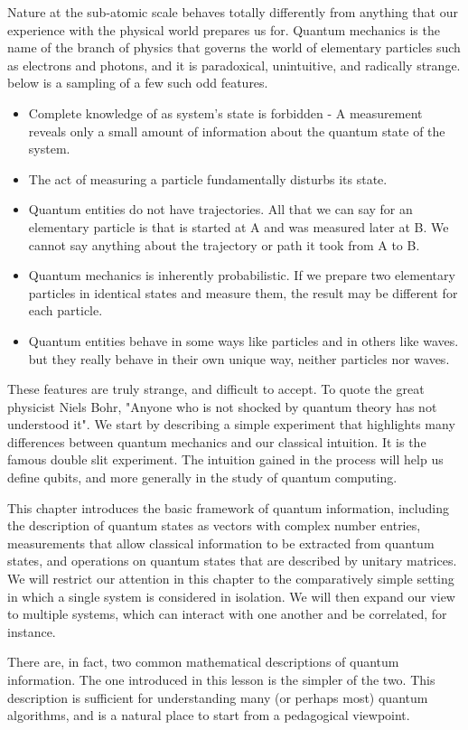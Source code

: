 Nature at the sub-atomic scale behaves totally differently from anything that our experience with the physical world prepares us for. Quantum mechanics is the name of the branch of physics that governs the world of elementary particles such as electrons and photons, and it is paradoxical, unintuitive, and radically strange. below is a sampling of a few such odd features.
\begin{itemize}
    \item Complete knowledge of as system's state is forbidden - A measurement reveals only a small amount of information about the quantum state of the system.
    \item The act of measuring a particle fundamentally disturbs its state.
    \item Quantum entities do not have trajectories. All that we can say for an elementary particle is that is started at A and was measured later at B. We cannot say anything about the trajectory or path it took from A to B.
    \item Quantum mechanics is inherently probabilistic. If we prepare two elementary particles in identical states and measure them, the result may be different for each particle.
    \item Quantum entities behave in some ways like particles and in others like waves. but they really behave in their own unique way, neither particles nor waves.
\end{itemize}
These features are truly strange, and difficult to accept. To quote the great physicist Niels Bohr, "Anyone who is not shocked by quantum theory has not understood it". We start by describing a simple experiment that highlights many differences between quantum mechanics and our classical intuition. It is the famous double slit experiment. The intuition gained in the process will help us define qubits, and more generally in the study of quantum computing.

This chapter introduces the basic framework of quantum information, including the description of quantum states as vectors with complex number entries, measurements that allow classical information to be extracted from quantum states, and operations on quantum states that are described by unitary matrices. We will restrict our attention in this chapter to the comparatively simple setting in which a single system is considered in isolation. We will then expand our view to multiple systems, which can interact with one another and be correlated, for instance.

There are, in fact, two common mathematical descriptions of quantum information. The one introduced in this lesson is the simpler of the two. This description is sufficient for understanding many (or perhaps most) quantum algorithms, and is a natural place to start from a pedagogical viewpoint.


